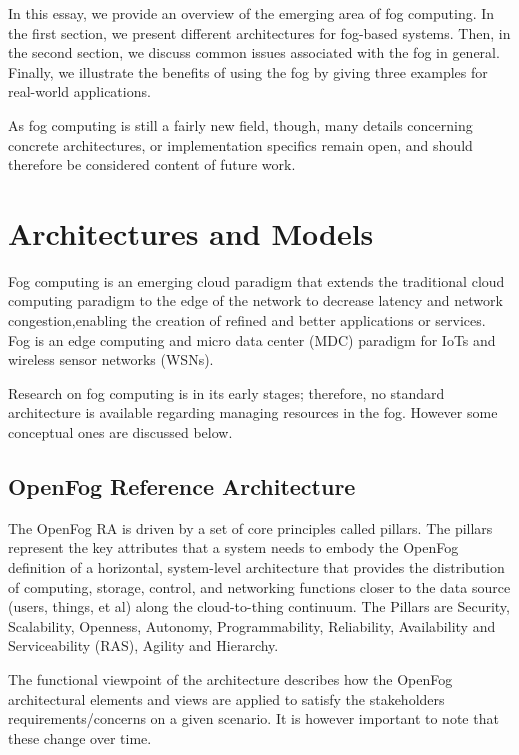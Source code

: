 \documentclass{article}
\begin{document}
In this essay, we provide an overview of the emerging area of fog computing. In the first section, we present different architectures for fog-based systems. Then, in the second section, we discuss common issues associated with the fog in general. Finally, we illustrate the benefits of using the fog by giving three examples for real-world applications.

As fog computing is still a fairly new field, though, many details concerning concrete architectures, or implementation specifics remain open, and should therefore be considered content of future work.

\section{Architectures and Models}

Fog computing is an emerging cloud paradigm that extends the traditional cloud computing paradigm to the edge of the network to decrease latency and network congestion,enabling the creation of refined and better applications or services. Fog is an edge computing and micro data center (MDC) paradigm for IoTs and wireless sensor networks (WSNs).

Research on fog computing is in its early stages; therefore, no standard architecture is available regarding managing resources in the fog. However some conceptual ones are discussed below.
\subsection{OpenFog Reference Architecture}

The OpenFog RA is driven by a set of core principles called pillars\cite{openfogconsortium2017}.
The pillars represent the key attributes that a system needs to embody the OpenFog definition of a horizontal, system-level architecture that provides the distribution of computing, storage, control, and networking functions closer to the data source (users, things, et al) along the cloud-to-thing continuum\cite{openfogconsortium2017}.
The Pillars are Security, Scalability, Openness, Autonomy, Programmability, Reliability, Availability and Serviceability (RAS), Agility and Hierarchy.

The functional viewpoint of the architecture describes how the OpenFog architectural elements and views are applied to satisfy the stakeholders requirements/concerns on a given scenario. It is however important to note that these change over time. 
\end{document}
